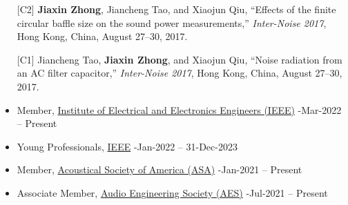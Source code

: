 \documentclass[10pt,a4paper,ragged2e,withhyper]{altacv}
\newcommand{\PubConference}[1]{\textit{#1}}
\newcommand{\PubTitle}[1]{``{#1,}''}
\newcommand{\PubMe}[1]{\textbf{#1}}
\newcommand{\hrefhl}[2]{{\color{accent}\href{#1}{#2}}}
\begin{document}
\begin{itemize}[leftmargin = 25pt]
    \item[{[C2]}] \PubMe{Jiaxin Zhong}, Jiancheng Tao, and Xiaojun Qiu,
        \PubTitle{Effects of the finite circular baffle size on the sound power measurements}
        \PubConference{Inter-Noise 2017},
        Hong Kong, China, 
        August 27--30, 2017.
        \href{https://github.com/JiaxinZhong/JiaxinZhong.github.io/raw/master/publications/conference/Zhong2017-InterNoise-Sound_power_measurement.pdf}{\color{accent}\faFilePdf[regular]}
    
    \item[{[C1]}] Jiancheng Tao, \PubMe{Jiaxin Zhong}, and Xiaojun Qiu,
        \PubTitle{Noise radiation from an AC filter capacitor}
        \PubConference{Inter-Noise 2017},
        Hong Kong, China, 
        August 27--30, 2017.
        \href{https://github.com/JiaxinZhong/JiaxinZhong.github.io/raw/master/publications/conference/Tao2017-Internoise-AC_capacitor.pdf}{\color{accent}\faFilePdf[regular]}
\end{itemize}



\begin{itemize}
    \item Member, \hrefhl{https://www.ieee.org/membership/index.html}{Institute of Electrical and Electronics Engineers (IEEE)} \hfill {}-Mar-2022 -- Present

    \item Young Professionals, \hrefhl{https://yp.ieee.org/}{IEEE} 
        \hfill {}-Jan-2022 -- 31-Dec-2023

    \item Member, \hrefhl{https://acousticalsociety.org/asa-membership/}{Acoustical Society of America (ASA)} 
        \hfill {}-Jan-2021 -- Present

    \item Associate Member, \hrefhl{https://aes2.org/aes-membership-overview/}{Audio Engineering Society (AES)} 
        \hfill {}-Jul-2021 -- Present
\end{itemize}
\end{document}
